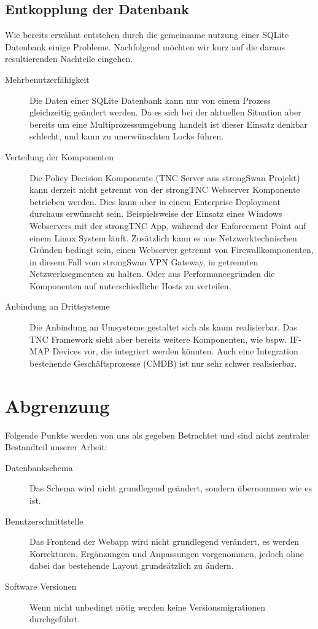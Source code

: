 \subsection{Entkopplung der Datenbank} Wie bereits erwähnt entstehen durch die
gemeinsame nutzung einer SQLite Datenbank einige Probleme. Nachfolgend möchten wir kurz auf die daraus resultierenden Nachteile eingehen.
\begin{description}
\item[Mehrbenutzerfähigkeit]
Die Daten einer SQLite Datenbank kann nur von einem Prozess gleichzeitig geändert werden.
Da es sich bei der aktuellen Situation aber bereits um eine Multiprozessumgebung handelt ist dieser Einsatz denkbar schlecht, und kann zu unerwünschten Locks führen.

\item[Verteilung der Komponenten] Die Policy Decision Komponente (TNC Server aus
strongSwan Projekt) kann derzeit nicht getrennt von der strongTNC Webserver
Komponente betrieben werden. Dies kann aber in einem Enterprise Deployment
durchaus erwünscht sein. Beispielsweise der Einsatz eines Windows Webservers mit der strongTNC App, während der Enforcement Point auf einem Linux System läuft. Zusätzlich kann es aus Netzwerktechnischen Gründen bedingt sein, einen Webserver getrennt von
Firewallkomponenten, in diesem Fall vom strongSwan VPN Gateway, in getrennten Netzwerksegmenten zu halten. Oder aus Performancegründen die Komponenten auf unterschiedliche Hosts zu verteilen.

\item[Anbindung an Drittsysteme]
Die Anbindung an Umsysteme gestaltet sich als kaum realisierbar. Das TNC Framework sieht aber bereits weitere Komponenten, wie bspw. IF-MAP Devices vor, die integriert werden könnten. Auch eine Integration bestehende Geschäftsprozesse (CMDB) ist nur sehr schwer realisierbar.
\end{description}


\section{Abgrenzung}
Folgende Punkte werden von uns als gegeben Betrachtet und sind nicht zentraler
Bestandteil unserer Arbeit:
\begin{description}
	\item[Datenbankschema] Das Schema wird nicht grundlegend geändert, sondern
	übernommen wie es ist.
	
	\item[Benutzerschnittstelle] Das Frontend der Webapp wird nicht grundlegend
	verändert, es werden Korrekturen, Ergänzungen und Anpassungen vorgenommen,
	jedoch ohne dabei das bestehende Layout grundsätzlich zu ändern.
	
	\item[Software Versionen] Wenn nicht unbedingt nötig werden keine
	Versionsmigrationen durchgeführt.
\end{description}


